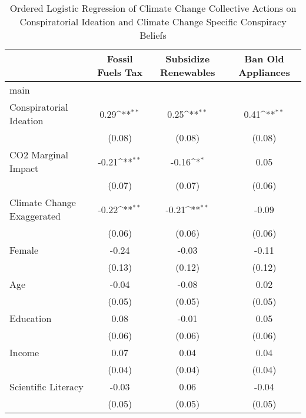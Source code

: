 \begin{table}[htbp]\centering
\def\sym#1{\ifmmode^{#1}\else\(^{#1}\)\fi}
\caption{Ordered Logistic Regression of Climate Change Collective Actions on Conspiratorial Ideation and Climate Change Specific Conspiracy Beliefs}
\begin{tabular}{l*{3}{c}}
\hline\hline
                    &\multicolumn{1}{c}{Fossil Fuels Tax}&\multicolumn{1}{c}{Subsidize Renewables}&\multicolumn{1}{c}{Ban Old Appliances}\\
\hline
main                &                    &                    &                    \\
Conspiratorial Ideation&        0.29\sym{**}&        0.25\sym{**}&        0.41\sym{**}\\
                    &      (0.08)        &      (0.08)        &      (0.08)        \\
[1em]
CO2 Marginal Impact &       -0.21\sym{**}&       -0.16\sym{*} &        0.05        \\
                    &      (0.07)        &      (0.07)        &      (0.06)        \\
[1em]
Climate Change Exaggerated&       -0.22\sym{**}&       -0.21\sym{**}&       -0.09        \\
                    &      (0.06)        &      (0.06)        &      (0.06)        \\
[1em]
Female              &       -0.24        &       -0.03        &       -0.11        \\
                    &      (0.13)        &      (0.12)        &      (0.12)        \\
[1em]
Age                 &       -0.04        &       -0.08        &        0.02        \\
                    &      (0.05)        &      (0.05)        &      (0.05)        \\
[1em]
Education           &        0.08        &       -0.01        &        0.05        \\
                    &      (0.06)        &      (0.06)        &      (0.06)        \\
[1em]
Income              &        0.07        &        0.04        &        0.04        \\
                    &      (0.04)        &      (0.04)        &      (0.04)        \\
[1em]
Scientific Literacy &       -0.03        &        0.06        &       -0.04        \\
                    &      (0.05)        &      (0.05)        &      (0.05)        \\

\end{tabular}
\end{table}
